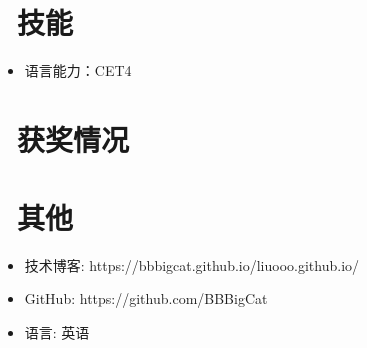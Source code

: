 \documentclass{resume}
\begin{document}
\
\vspace{-2ex}
\begin{onehalfspacing}
\end{onehalfspacing}

\section{\faCogs\ 技能}
\begin{itemize}[parsep=0.5ex]
  \item 语言能力：CET4
 \end{itemize}

\section{\faHeartO\ 获奖情况}

\section{\faInfo\ 其他}
\begin{itemize}[parsep=0.5ex]
  \item 技术博客: https://bbbigcat.github.io/liuooo.github.io/
  \item GitHub: https://github.com/BBBigCat
  \item 语言: 英语
\end{itemize}

%
%
\end{document}
